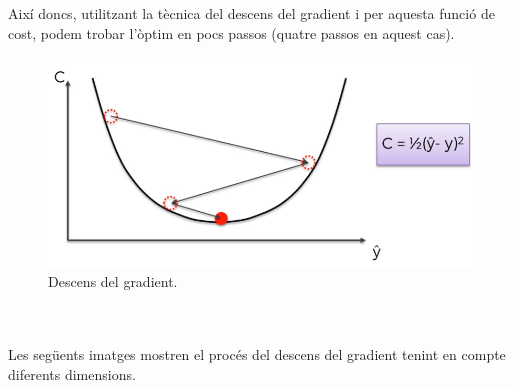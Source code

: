 \documentclass[12pt]{article}
\begin{document}
\\\\Així doncs, utilitzant la tècnica del descens del gradient i per aquesta funció de cost, podem trobar l'òptim en pocs passos (quatre passos en aquest cas).
\begin{figure}[h!]
	\centering
	\includegraphics[scale=0.3]{imatges/dg/6dg6.png}
	\caption{Descens del gradient.}
\end{figure}
\pagebreak 
\\\\Les següents imatges mostren el procés del descens del gradient tenint en compte diferents dimensions.
\end{document}
